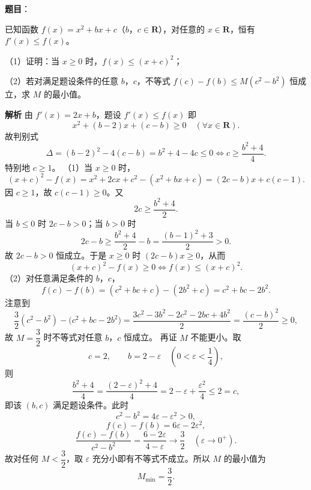 \begin{answer}

\textbf{题目}：

已知函数 $f(x)=x^2+bx+c$（$b$，$c\in\mathbf R$），对任意的 $x\in\mathbf R$，恒有 $f'(x)\leqslant f(x)$。

（1）证明：当 $x\geqslant0$ 时，$f(x)\leqslant(x+c)^2$；

（2）若对满足题设条件的任意 $b$，$c$，不等式 $f(c)-f(b)\leqslant M(c^2-b^2)$ 恒成立，求 $M$ 的最小值。

\textbf{解析}
由 $f'(x)=2x+b$，题设 $f'(x)\leqslant f(x)$ 即
\nopagebreak[4]
\[x^2+(b-2)x+(c-b)\geqslant0\quad(\forall x\in\mathbf R).\]
故判别式
\nopagebreak[4]
\[\Delta=(b-2)^2-4(c-b)=b^2+4-4c\leqslant0\iff c\geqslant\frac{b^2+4}{4}.\]
特别地 $c\geqslant1$。
（1）当 $x\geqslant0$ 时，
\nopagebreak[4]
\[(x+c)^2-f(x)=x^2+2cx+c^2-(x^2+bx+c)=(2c-b)x+c(c-1).\]
因 $c\geqslant1$，故 $c(c-1)\geqslant0$。又
\nopagebreak[4]
\[2c\geqslant\frac{b^2+4}{2}.\]
当 $b\leqslant0$ 时 $2c-b>0$；当 $b>0$ 时
\nopagebreak[4]
\[2c-b\geqslant\frac{b^2+4}{2}-b=\frac{(b-1)^2+3}{2}>0.\]
故 $2c-b>0$ 恒成立。于是 $x\geqslant0$ 时 $(2c-b)x\geqslant0$，从而
\nopagebreak[4]
\[(x+c)^2-f(x)\geqslant0\iff f(x)\leqslant(x+c)^2.\]
（2）对任意满足条件的 $b$，$c$，
\nopagebreak[4]
\[f(c)-f(b)=(c^2+bc+c)-(2b^2+c)=c^2+bc-2b^2.\]
注意到
\nopagebreak[4]
\[\frac32(c^2-b^2)-\bigl(c^2+bc-2b^2\bigr)
=\frac{3c^2-3b^2-2c^2-2bc+4b^2}{2}
=\frac{(c-b)^2}{2}\geqslant0,\]
故 $M=\dfrac32$ 时不等式对任意 $b$，$c$ 恒成立。
再证 $M$ 不能更小。取
\nopagebreak[4]
\[c=2,\qquad b=2-\varepsilon\quad\left(0<\varepsilon<\frac14\right),\]
则
\nopagebreak[4]
\[\frac{b^2+4}{4}=\frac{(2-\varepsilon)^2+4}{4}=2-\varepsilon+\frac{\varepsilon^2}{4}\leqslant2=c,\]
即该 $(b,c)$ 满足题设条件。此时
\nopagebreak[4]
\[c^2-b^2=4\varepsilon-\varepsilon^2>0,\]
\nopagebreak[4]
\[f(c)-f(b)=6\varepsilon-2\varepsilon^2,\]
\nopagebreak[4]
\[\frac{f(c)-f(b)}{c^2-b^2}=\frac{6-2\varepsilon}{4-\varepsilon}\longrightarrow\frac32\quad(\varepsilon\to0^+).\]
故对任何 $M<\dfrac32$，取 $\varepsilon$ 充分小即有不等式不成立。所以 $M$ 的最小值为
\nopagebreak[4]
\[M_{\min}=\frac32.\]


\end{answer}

